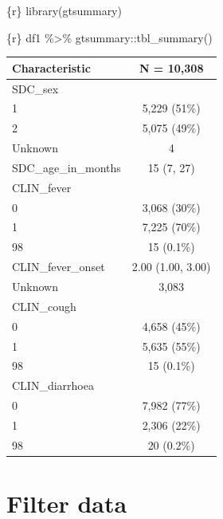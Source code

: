 \documentclass[
  letterpaper,
  DIV=11,
  numbers=noendperiod,
  oneside]{scrreprt}
\newenvironment{Shaded}{\begin{snugshade}}{\end{snugshade}}
\newcommand{\FunctionTok}[1]{\textcolor[rgb]{0.28,0.35,0.67}{#1}}
\newcommand{\InformationTok}[1]{\textcolor[rgb]{0.37,0.37,0.37}{#1}}
\newcommand{\NormalTok}[1]{\textcolor[rgb]{0.00,0.23,0.31}{#1}}
\newcommand{\SpecialCharTok}[1]{\textcolor[rgb]{0.37,0.37,0.37}{#1}}
\begin{document}
\begin{Shaded}
\begin{Highlighting}[]
\InformationTok{\textasciigrave{}\textasciigrave{}\textasciigrave{}\{r\}}
\FunctionTok{library}\NormalTok{(gtsummary)}
\InformationTok{\textasciigrave{}\textasciigrave{}\textasciigrave{}}
\end{Highlighting}
\end{Shaded}

\begin{Shaded}
\begin{Highlighting}[]
\InformationTok{\textasciigrave{}\textasciigrave{}\textasciigrave{}\{r\}}
\NormalTok{df1 }\SpecialCharTok{\%\textgreater{}\%} 
\NormalTok{  gtsummary}\SpecialCharTok{::}\FunctionTok{tbl\_summary}\NormalTok{()}
\InformationTok{\textasciigrave{}\textasciigrave{}\textasciigrave{}}
\end{Highlighting}
\end{Shaded}

\begin{longtable}[]{@{}lc@{}}
\toprule\noalign{}
\textbf{Characteristic} & \textbf{N = 10,308} \\
\midrule\noalign{}
\endhead
\bottomrule\noalign{}
\endlastfoot
SDC\_sex & \\
1 & 5,229 (51\%) \\
2 & 5,075 (49\%) \\
Unknown & 4 \\
SDC\_age\_in\_months & 15 (7, 27) \\
CLIN\_fever & \\
0 & 3,068 (30\%) \\
1 & 7,225 (70\%) \\
98 & 15 (0.1\%) \\
CLIN\_fever\_onset & 2.00 (1.00, 3.00) \\
Unknown & 3,083 \\
CLIN\_cough & \\
0 & 4,658 (45\%) \\
1 & 5,635 (55\%) \\
98 & 15 (0.1\%) \\
CLIN\_diarrhoea & \\
0 & 7,982 (77\%) \\
1 & 2,306 (22\%) \\
98 & 20 (0.2\%) \\
\end{longtable}

\hypertarget{filter-data}{%
\section{Filter data}\label{filter-data}}
\end{document}
